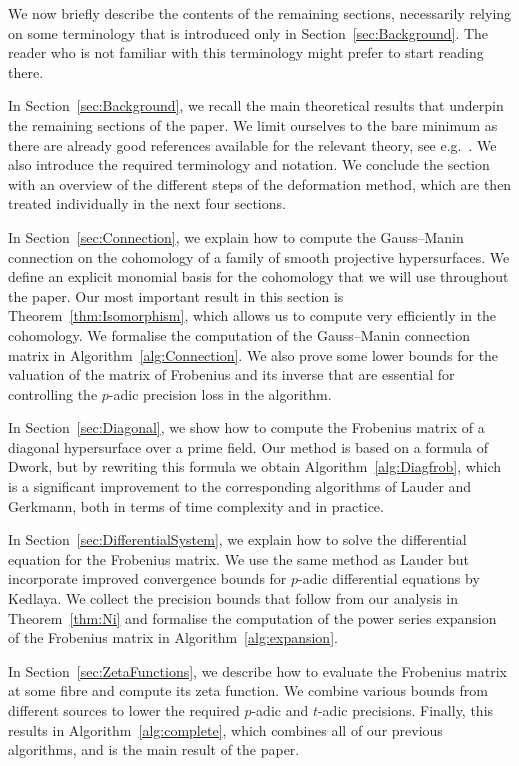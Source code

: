 \documentclass[a4paper,11pt]{article}
\numberwithin{equation}{section}
\theoremstyle{definition}
\begin{document}
We now briefly describe the contents of the remaining sections,
necessarily relying on some terminology that is introduced only 
in Section~\ref{sec:Background}.  The reader who is not familiar 
with this terminology might prefer to start reading there.

In Section~\ref{sec:Background}, we recall the main theoretical results that 
underpin the remaining sections of the paper.  We limit ourselves to the bare 
minimum as there are already good references available for the relevant theory, 
see e.g.~\citep{Kedlaya2012}. We also introduce the required terminology and 
notation. We conclude the section with an overview of the different steps of 
the deformation method, which are then treated individually in the next four 
sections.

In Section~\ref{sec:Connection}, we explain how to compute the Gauss--Manin 
connection on the cohomology of a family of smooth projective hypersurfaces. 
We define an explicit monomial basis for the cohomology that we will use 
throughout the paper. Our most important result in this section
is Theorem~\ref{thm:Isomorphism}, which allows us to compute very efficiently 
in the cohomology. We formalise the computation of the Gauss--Manin connection 
matrix in Algorithm~\ref{alg:Connection}. We also prove some lower bounds for 
the valuation of the matrix of Frobenius and its inverse that are essential 
for controlling the $p$-adic precision loss in the algorithm.

In Section~\ref{sec:Diagonal}, we show how to compute the Frobenius matrix of
a diagonal hypersurface over a prime field. Our method is based on a formula 
of Dwork, but by rewriting this formula we obtain Algorithm~\ref{alg:Diagfrob}, 
which is a significant improvement to the corresponding algorithms of Lauder 
and Gerkmann, both in terms of time complexity and in practice.

In Section~\ref{sec:DifferentialSystem}, we explain how to solve the 
differential equation for the Frobenius matrix. We use the same method as 
Lauder but incorporate improved convergence bounds for $p$-adic differential 
equations by Kedlaya. We collect the precision bounds that follow from our 
analysis in Theorem~\ref{thm:Ni} and formalise the computation of the power 
series expansion of the Frobenius matrix in Algorithm~\ref{alg:expansion}.

In Section~\ref{sec:ZetaFunctions}, we describe how to evaluate the Frobenius 
matrix at some fibre and compute its zeta function. We combine various bounds 
from different sources to lower the required $p$-adic and $t$-adic precisions. 
Finally, this results in Algorithm~\ref{alg:complete}, which combines all of 
our previous algorithms, and is the main result of the paper.
\end{document}
